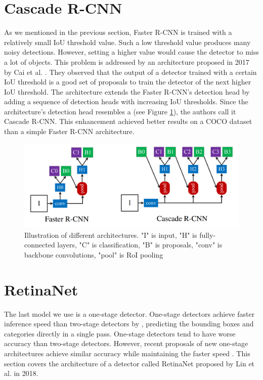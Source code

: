 \section{Cascade R-CNN}
As we mentioned in the previous section, Faster R-CNN is trained with a relatively small IoU threshold value. Such a low threshold value produces many noisy detections. However, setting a higher value would cause the detector to miss a lot of objects. This problem is addressed by an architecture proposed in 2017 by Cai et al. \cite{cascadercnn}. They observed that the output of a detector trained with a certain IoU threshold is a good set of proposals to train the detector of the next higher IoU threshold. The architecture extends the Faster R-CNN's detection head by adding a sequence of detection heads with increasing IoU thresholds. Since the architecture's detection head resembles a  (see Figure \ref{fig:cascade}), the authors call it Cascade R-CNN. This enhancement achieved better results on a COCO dataset \cite{coco} than a simple Faster R-CNN architecture.

\begin{figure}[h]
    \centering
    \includegraphics[width=0.7\linewidth]{Sources/Figures/cascade.png}
    \caption{Illustration of different architectures. "I" is input, "H" is fully-connected layers, "C" is classification, "B" is proposals, "conv" is backbone convolutions, "pool" is RoI pooling \cite{cascadercnn}}
    \label{fig:cascade}
\end{figure}

\section{RetinaNet}
The last model we use is a one-stage detector. One-stage detectors achieve faster inference speed than two-stage detectors by , predicting the bounding boxes and categories directly in a single pass. One-stage detectors tend to have worse accuracy than two-stage detectors.  However, recent proposals of new one-stage architectures achieve similar accuracy while maintaining the faster speed \cite{retinanet, yolo3}. This section covers the architecture of a detector called RetinaNet proposed by Lin et al. in 2018. 

